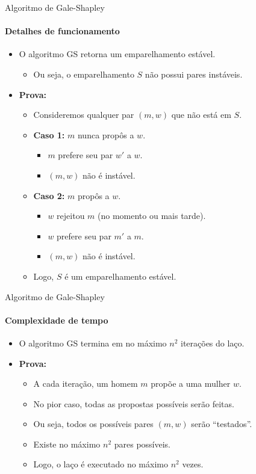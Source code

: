 \begin{frame}{Algoritmo de Gale-Shapley}
\framesubtitle{Detalhes de funcionamento}

	\begin{itemize}
		\item {\color{magenta}O algoritmo GS retorna um emparelhamento estável.}
		\begin{itemize}
			\item Ou seja, o emparelhamento $S$ não possui pares instáveis.
		\end{itemize}
	
		\medskip
		\item \textbf{Prova:}
		\begin{itemize}
			\item Consideremos qualquer par $(m, w)$ que não está em $S$.
			\medskip
			\item \textbf{Caso 1:} $m$ nunca propôs a $w$.
			\begin{itemize}
				\item $m$ prefere seu par $w'$ a $w$.
				\item $(m, w)$ não é instável.
			\end{itemize}
		
			\medskip
			\item \textbf{Caso 2:} $m$ propôs a $w$.
			\begin{itemize}
				\item $w$ rejeitou $m$ (no momento ou mais tarde).
				\item $w$ prefere seu par $m'$ a $m$.
				\item $(m, w)$ não é instável.
			\end{itemize}
		
			\medskip
			\item Logo, $S$ é um emparelhamento estável.
		\end{itemize}
	\end{itemize}
\end{frame}



\begin{frame}{Algoritmo de Gale-Shapley}
\framesubtitle{Complexidade de tempo}

	\begin{itemize}
		\item {\color{magenta}O algoritmo GS termina em no máximo $n^2$ iterações do laço.}
		
		\medskip
		\item \textbf{Prova:}
		\begin{itemize}
			\item A cada iteração, um homem $m$ propõe a uma mulher $w$.
			\item No pior caso, todas as propostas possíveis serão feitas.
			\item Ou seja, todos os possíveis pares $(m, w)$ serão ``testados''.
			\item Existe no máximo $n^2$ pares possíveis.
			\item Logo, o laço é executado no máximo $n^2$ vezes.
		\end{itemize}
	\end{itemize}
\end{frame}



